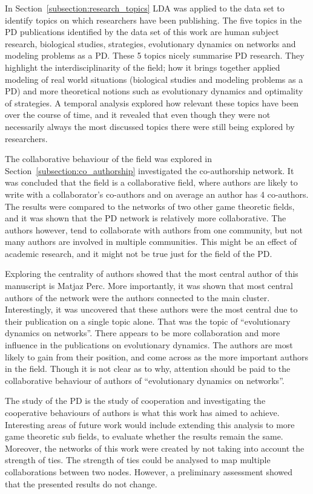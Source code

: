 \documentclass{article}
\theoremstyle{definition}
\begin{document}
In Section~\ref{subsection:research_topics} LDA was applied to the data set to
identify topics on which researchers have been publishing. The five topics in
the PD publications identified by the data set of this work are human subject
research, biological studies, strategies, evolutionary dynamics on networks and
modeling problems as a PD. These 5 topics nicely summarise PD research. They
highlight the interdisciplinarity of the field; how it brings together applied
modeling of real world situations (biological studies and modeling problems as a
PD) and more theoretical notions such as evolutionary dynamics and optimality of
strategies. A temporal analysis explored how relevant these topics have been
over the course of time, and it revealed that even though they were not
necessarily always the most discussed topics there were still being explored
by researchers.

The collaborative behaviour of the field was explored in
Section~\ref{subsection:co_authorship} investigated the co-authorship
network. It was concluded that the field is a collaborative field, where authors
are likely to write with a collaborator's co-authors and on average an author
has 4 co-authors. The results were compared to the networks of two other game
theoretic fields, and it was shown that the PD network is relatively more collaborative. The
authors however, tend to collaborate with authors from one community, but not
many authors are involved in multiple communities. This might be an effect of
academic research, and it might not be true just for the field of the PD.

Exploring the centrality of authors showed that the most central author of this
manuscript is Matjaz Perc. More importantly, it was shown that most central
authors of the network were the authors connected to the main cluster.
Interestingly, it was uncovered that these authors were the most central due to
their publication on a single topic alone. That was the topic of “evolutionary
dynamics on networks”. There appears to be more collaboration and more influence
in the publications on evolutionary dynamics. The authors are most likely to
gain from their position, and come across as the more important authors in the
field. Though it is not clear as to why, attention should be paid to the
collaborative behaviour of authors of “evolutionary dynamics on networks”.

The study of the PD is the study of cooperation and investigating the
cooperative behaviours of authors is what this work has aimed to achieve.
Interesting areas of future work would include extending this analysis to more
game theoretic sub fields, to evaluate whether the results remain the same.
Moreover, the networks of this work were created by not taking into account the
strength of ties. The strength of ties could be analysed to map multiple
collaborations between two nodes. However, a preliminary assessment showed that
the presented results do not change.
\end{document}
